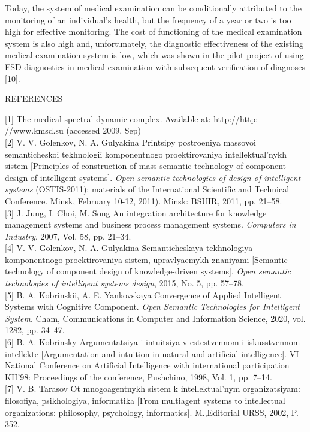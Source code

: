 \documentclass{article}
\begin{document}
\begin{multicols*}{2}
Today, the system of medical examination can be
conditionally attributed to the monitoring of an individual’s health, but the frequency of a year or two is too
high for effective monitoring. The cost of functioning
of the medical examination system is also high and,
unfortunately, the diagnostic effectiveness of the existing
medical examination system is low, which was shown in
the pilot project of using FSD diagnostics in medical
examination with subsequent verification of diagnoses
[10].
\begin{center}
   REFERENCES
\end{center}
 {\small [1] The medical spectral-dynamic complex. Available at: http://http:
//www.kmsd.su (accessed 2009, Sep)}\\
{\small [2] V. V. Golenkov, N. A. Gulyakina Printsipy postroeniya massovoi
semanticheskoi tekhnologii komponentnogo proektirovaniya intellektual’nykh sistem [Principles of construction of mass semantic technology of component design of intelligent systems]. {\emph {Open
semantic technologies of design of intelligent systems}} (OSTIS-2011): materials of the International Scientific and Technical
Conference. Minsk, February 10-12, 2011). Minsk: BSUIR, 2011,
pp. 21–58. }\\
{\footnotesize [3] J. Jung, I. Choi, M. Song An integration architecture for knowledge management systems and business process management
systems. \emph{Computers in Industry}, 2007, Vol. 58, pp. 21–34.}\\
 {\footnotesize [4] V. V. Golenkov, N. A. Gulyakina Semanticheskaya tekhnologiya
komponentnogo proektirovaniya sistem, upravlyaemykh
znaniyami [Semantic technology of component design of
knowledge-driven systems]. \emph{Open semantic technologies of
intelligent systems design}, 2015, No. 5, pp. 57–78. }\\
{\footnotesize [5] B. A. Kobrinskii, A. E. Yankovskaya Convergence of Applied
Intelligent Systems with Cognitive Component.\emph{ Open Semantic
Technologies for Intelligent System}. Cham, Communications in
Computer and Information Science, 2020, vol. 1282, pp. 34–47.}\\
{\footnotesize [6] B. A. Kobrinsky Argumentatsiya i intuitsiya v estestvennom i
iskusstvennom intellekte [Argumentation and intuition in natural
and artificial intelligence]. VI National Conference on Artificial
Intelligence with international participation KII’98: Proceedings
of the conference, Pushchino, 1998, Vol. 1, pp. 7–14. }\\
 {\footnotesize [7] V. B. Tarasov Ot mnogoagentnykh sistem k intellektual’nym organizatsiyam: filosofiya, psikhologiya, informatika [From multiagent systems to intellectual organizations: philosophy, psychology, informatics]. M.,Editorial URSS, 2002, P. 352.
}
\end{multicols*}
\end{document}
